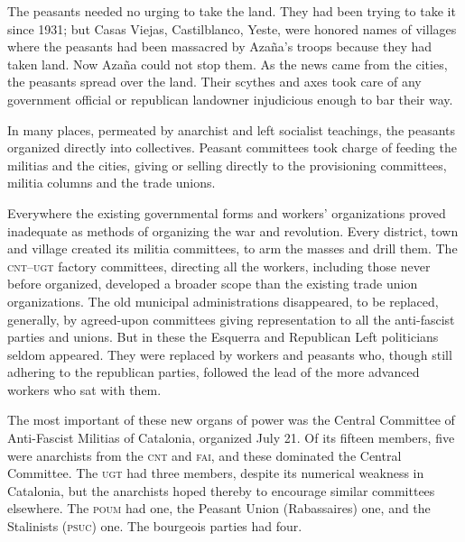 The peasants needed no urging to take the land. They had been trying to take it since 1931; but Casas Viejas, Castilblanco, Yeste, were honored names of villages where the peasants had been massacred by Azaña’s troops because they had taken land. Now Azaña could not stop them. As the news came from the cities, the peasants spread over the land. Their scythes and axes took care of any government official or republican landowner injudicious enough to bar their way.

In many places, permeated by anarchist and left socialist teachings, the peasants organized directly into collectives. Peasant committees took charge of feeding the militias and the cities, giving or selling directly to the provisioning committees, militia columns and the trade unions.

Everywhere the existing governmental forms and workers’ organizations proved inadequate as methods of organizing the war and revolution. Every district, town and village created its militia committees, to arm the masses and drill them. The \textsc{cnt--ugt} factory committees, directing all the workers, including those never before organized, developed a broader scope than the existing trade union organizations. The old municipal administrations disappeared, to be replaced, generally, by agreed-upon committees giving representation to all the anti-fascist parties and unions. But in these the Esquerra and Republican Left politicians seldom appeared. They were replaced by workers and peasants who, though still adhering to the republican parties, followed the lead of the more advanced workers who sat with them.
\indexCNT\indexUGT{}

The most important of these new organs of power was the Central Committee of Anti-Fascist Militias of Catalonia, organized July 21. Of its fifteen members, five were anarchists from the \textsc{cnt} and \textsc{fai}, and these dominated the Central Committee. The \textsc{ugt} had three members, despite its numerical weakness in Catalonia, but the anarchists hoped thereby to encourage similar committees elsewhere. The \textsc{poum} had one, the Peasant Union (Rabassaires) one, and the Stalinists (\textsc{psuc}) one. The bourgeois parties had four.

